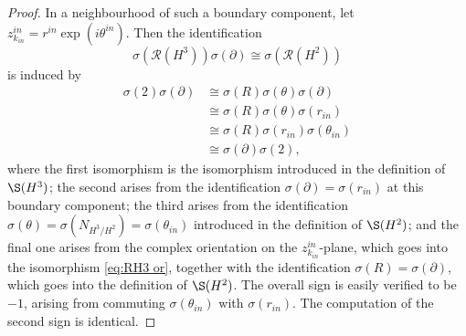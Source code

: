 \documentclass[10pt,a4paper]{amsart}
\def\cR{\mathcal{R}}
\begin{document}
\begin{proof}
    In a neighbourhood of such a boundary component, let $z^{in}_{k_{in}} = r^{in} \exp( i\theta^{in})$. 
    Then the identification
    $$\sigma(\cR(H^3)) \sigma(\partial) \cong \sigma(\cR(H^2))$$
    is induced by 
    \begin{align*}
        \sigma(2) \sigma(\partial) &\cong \sigma(R)\sigma(\theta)\sigma(\partial) \\
        & \cong \sigma(R)\sigma(\theta)\sigma(r_{in}) \\
        & \cong \sigma(R)\sigma(r_{in})\sigma(\theta_{in}) \\
        &\cong \sigma(\partial) \sigma(2),
    \end{align*}
    where the first isomorphism is the isomorphism introduced in the definition of $\S(H^3)$; the second arises from the identification $\sigma(\partial) = \sigma(r_{in})$ at this boundary component; the third arises from the identification $\sigma(\theta) = \sigma(N_{H^3/H^2}) = \sigma(\theta_{in})$ introduced in the definition of $\S(H^2)$; and the final one arises from the complex orientation on the $z^{in}_{k_{in}}$-plane, which goes into the isomorphism \eqref{eq:RH3 or}, together with the identification $\sigma(R) = \sigma(\partial)$, which goes into the definition of $\S(H^2)$.
    The overall sign is easily verified to be $-1$, arising from commuting $\sigma(\theta_{in})$ with $\sigma(r_{in})$. 
    The computation of the second sign is identical.
\end{proof}
\end{document}
